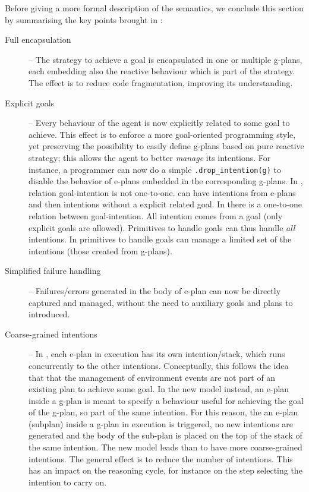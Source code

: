 Before giving a more formal description of the semantics, we conclude this section by summarising the key points brought in {\aser}:
%
\begin{description}
%
\item[Full encapsulation] -- The strategy to achieve a goal is encapsulated in one or multiple g-plans, each embedding also the reactive behaviour which is part of the strategy. 
%
The effect is to reduce code fragmentation, improving its understanding.
%
\item[Explicit goals] -- Every behaviour of the agent is now explicitly related to some goal to achieve.
%
This effect is to enforce a more goal-oriented programming style, yet preserving the possibility to easily define g-plans based on pure reactive strategy;
%
this allows the agent to better \emph{manage} its intentions. For instance, a programmer can now do a simple \texttt{.drop\_intention(g)} to disable the behavior of e-plans embedded in the corresponding g-plans. 
%
In {\asl}, relation goal-intention is not one-to-one. {\asl} can have intentions from e-plans and then intentions without a explicit related goal. %
In {\aser} there is a one-to-one relation between goal-intention. 
%
All intention comes from a goal (only explicit goals are allowed). 
%
Primitives to handle goals can thus handle \emph{all} intentions. 
%
In {\asl} primitives to handle goals can manage a limited set of the intentions (those created from g-plans). 


\item[Simplified failure handling] -- Failures/errors generated in the  body of e-plan can now be directly captured and managed, without the need to auxiliary goals and plans to introduced.

\item[Coarse-grained intentions] -- In {\asl}, each e-plan in execution has its own intention/stack, which runs concurrently to the other intentions. Conceptually, this follows the idea that that the management of environment events are not part of an existing plan to achieve some goal.
%
In the new model instead, an e-plan inside a g-plan is meant to specify a behaviour useful for achieving the goal of the g-plan, so part of the same intention.
%
For this reason, the an e-plan (subplan) inside a g-plan in execution is triggered, no new intentions are generated and the body of the sub-plan is placed on the top of the stack of the same intention. 
%
The new model leads than to have more coarse-grained intentions.
%
The general effect is to reduce the number of intentions. 
%
This has an impact on the reasoning cycle, for instance on the step selecting the intention to carry on.
\end{description}
